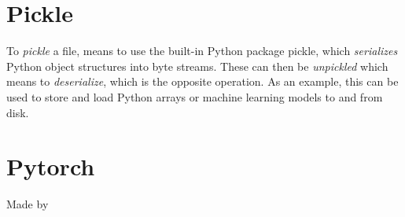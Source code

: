         
    \section{Pickle}
        To \textit{pickle}\cite{pickle} a file, means to use the built-in Python package pickle, which \textit{serializes} Python object structures into byte streams. These can then be \textit{unpickled} which means to \textit{deserialize}, which is the opposite operation. As an example, this can be used to store and load Python arrays or machine learning models to and from disk.
        
        
    \section{Pytorch} \label{Pytorch}
    
        Made by \cite{NEURIPS2019_9015}